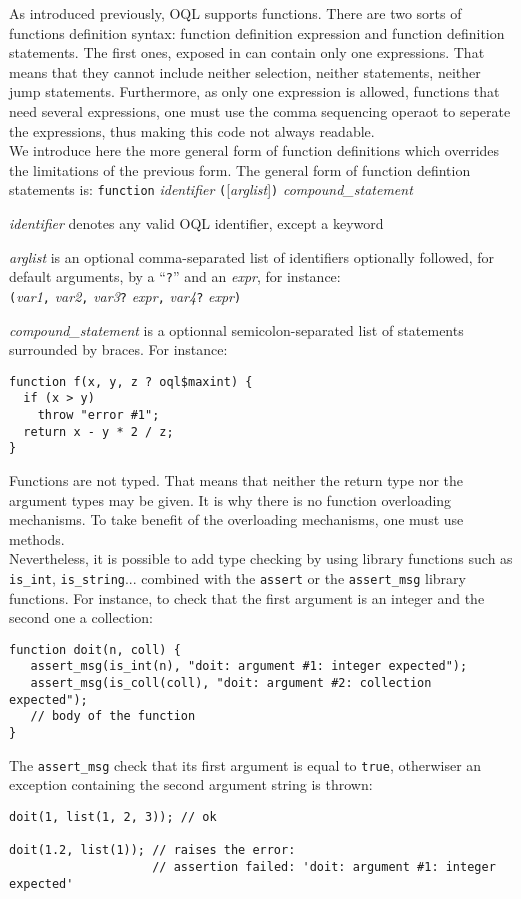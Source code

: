 As introduced previously, OQL supports functions. There are two sorts of
functions definition syntax:
function definition expression and function definition statements.
The first ones, exposed in  can contain only one
expressions. That means that they cannot include neither selection,
neither statements, neither jump statements.
Furthermore, as only one expression is allowed, functions that need
several expressions, one must use the comma sequencing operaot to
seperate the expressions, thus making this code not always readable.
\\
We introduce here the more general form of function definitions which 
overrides %
the limitations of the previous form.
The general form of function defintion statements is:
\texttt{function} \emph{identifier} \texttt{(}[\emph{arglist}]\texttt{)}
\emph{compound\_statement}
\be
\item \emph{identifier} denotes any valid OQL identifier, except a keyword
\item \emph{arglist} is an optional comma-separated list
of identifiers
optionally followed, for default arguments, by a ``\texttt{?}''
and an \emph{expr}, for instance:\\
\texttt{(}\emph{var1}\texttt{,} \emph{var2}\texttt{,} \emph{var3}\texttt{?} 
\emph{expr}\texttt{,} \emph{var4}\texttt{?} \emph{expr}\texttt{)}
\item \emph{compound\_statement} is a optionnal semicolon-separated
list of statements surrounded by braces.
\ee
For instance:
\begin{verbatim}
function f(x, y, z ? oql$maxint) {
  if (x > y)
    throw "error #1";
  return x - y * 2 / z;
}
\end{verbatim}
Functions are not typed. That means that neither the
return type nor the argument types may be given.
It is why there is no function overloading mechanisms. To take
benefit of the overloading mechanisms, one must use  methods.\\
Nevertheless, it is possible to add type checking by using
library functions such as \texttt{is\_int}, \texttt{is\_string}...
combined with the \texttt{assert} or the \texttt{assert\_msg}
library functions.
For instance, to check that the first argument is an integer
and the second one a collection:
\begin{verbatim}
function doit(n, coll) {
   assert_msg(is_int(n), "doit: argument #1: integer expected");
   assert_msg(is_coll(coll), "doit: argument #2: collection expected");
   // body of the function
}
\end{verbatim}
The \texttt{assert\_msg} check that its first argument is equal to
\texttt{true}, otherwiser an exception containing the second argument
string is thrown:
\begin{verbatim}
doit(1, list(1, 2, 3)); // ok

doit(1.2, list(1)); // raises the error:
                    // assertion failed: 'doit: argument #1: integer expected'
\end{verbatim}

